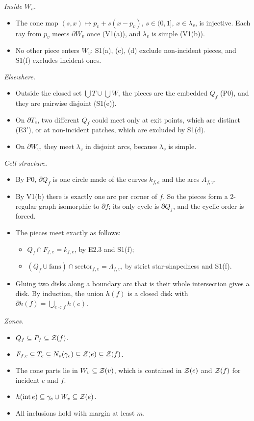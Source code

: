 \emph{Inside $W_v$.}
\begin{itemize}
\item The cone map $(s,x)\mapsto p_v+s(x-p_v)$, $s\in(0,1]$, $x\in\lambda_v$, is injective. Each ray from $p_v$ meets
$\partial W_v$ once (V1(a)), and $\lambda_v$ is simple (V1(b)).
\item No other piece enters $W_v$: S1(a), (c), (d) exclude non-incident pieces, and S1(f) excludes incident ones.
\end{itemize}

\emph{Elsewhere.}
\begin{itemize}
\item Outside the closed set $\bigcup T\cup\bigcup W$, the pieces are the embedded $Q_f$ (P0), and they are pairwise
disjoint (S1(e)).
\item On $\partial T_e$, two different $Q_f$ could meet only at exit points, which are distinct (E3$'$), or at
non-incident patches, which are excluded by S1(d).
\item On $\partial W_v$, they meet $\lambda_v$ in disjoint arcs, because $\lambda_v$ is simple.
\end{itemize}

\emph{Cell structure.}
\begin{itemize}
\item By P0, $\partial Q_f$ is one circle made of the curves $k_{f,e}$ and the arcs $A_{f,v}$.
\item By V1(b) there is exactly one arc per corner of $f$. So the pieces form a 2-regular graph isomorphic to
$\partial f$; its only cycle is $\partial Q_f$, and the cyclic order is forced.
\item The pieces meet exactly as follows:
  \begin{itemize}
  \item $Q_f\cap F_{f,e}=k_{f,e}$, by E2.3 and S1(f);
  \item $(Q_f\cup\text{fans})\cap\text{sector}_{f,v}=\Lambda_{f,v}$, by strict star-shapedness and S1(f).
  \end{itemize}
\item Gluing two disks along a boundary arc that is their whole intersection gives a disk. By induction, the union
$h(f)$ is a closed disk with $\partial h(f)=\bigcup_{e<f}h(e)$.
\end{itemize}

\emph{Zones.}
\begin{itemize}
\item $Q_f\subseteq P_f\subseteq\mathcal{Z}(f)$.
\item $F_{f,e}\subseteq T_e\subseteq N_\rho(\gamma_e)\subseteq\mathcal{Z}(e)\subseteq\mathcal{Z}(f)$.
\item The cone parts lie in $W_v\subseteq\mathcal{Z}(v)$, which is contained in $\mathcal{Z}(e)$ and $\mathcal{Z}(f)$ for incident $e$ and $f$.
\item $h(\operatorname{int} e)\subseteq\gamma_e\cup W_v\subseteq\mathcal{Z}(e)$.
\item All inclusions hold with margin at least $m$.
\end{itemize}

